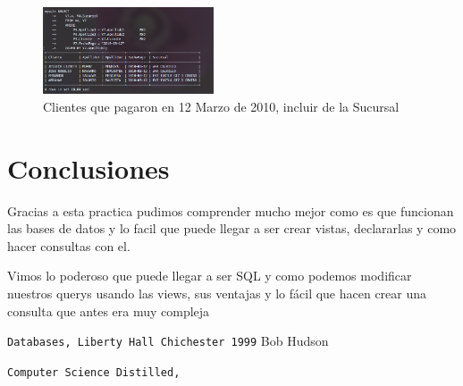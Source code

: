 \documentclass[12pt, fleqn]{article}                             %
\begin{document}
        \begin{figure}[ht!]
            \centering
            \includegraphics[width=0.45\textwidth]{BD5Reporte2Parte5}
            \caption{Clientes que pagaron en 12 Marzo de 2010, incluir de la Sucursal}
        \end{figure}










\clearpage
\section{Conclusiones}

    Gracias a esta practica pudimos comprender mucho mejor como es que funcionan las bases de datos
    y lo facil que puede llegar a ser crear vistas, declararlas y como hacer consultas con el.

    Vimos lo poderoso que puede llegar a ser SQL y como podemos modificar nuestros querys usando las 
    views, sus ventajas y lo fácil que hacen crear una consulta que antes era muy compleja




\begin{thebibliography}{9}

        \texttt{Databases, Liberty Hall Chichester 1999}
        Bob Hudson

        \texttt{Computer Science Distilled,}


     

\end{thebibliography}
\end{document}
